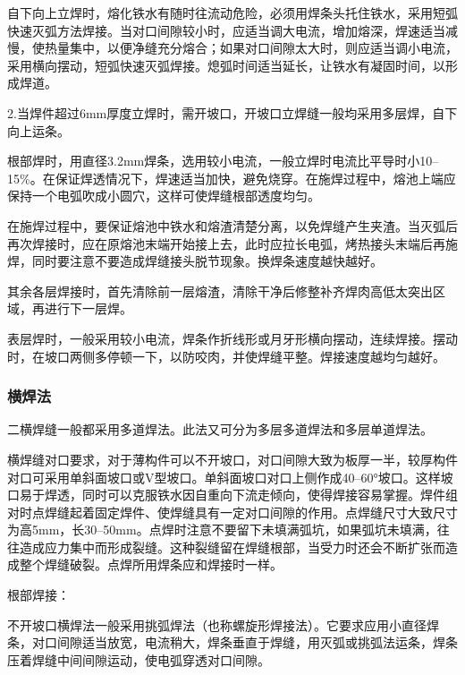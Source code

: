 \documentclass{ctexbook}
\begin{document}
自下向上立焊时，熔化铁水有随时往流动危险，必须用焊条头托住铁水，采用短弧快速灭弧方法焊接。当对口间隙较小时，应适当调大电流，增加熔深，焊速适当减慢，使热量集中，以便净缝充分熔合；如果对口间隙太大时，则应适当调小电流，采用横向摆动，短弧快速灭弧焊接。熄弧时间适当延长，让铁水有凝固时间，以形成焊道。

2.当焊件超过6mm厚度立焊时，需开坡口，开坡口立焊缝一般均采用多层焊，自下向上运条。

根部焊时，用直径3.2mm焊条，选用较小电流，一般立焊时电流比平导时小10--15\%。在保证焊透情况下，焊速适当加快，避免烧穿。在施焊过程中，熔池上端应保持一个电弧吹成小圆穴，这样可使焊缝根部透度均匀。

在施焊过程中，要保证熔池中铁水和熔渣清楚分离，以免焊缝产生夹渣。当灭弧后再次焊接时，应在原熔池末端开始接上去，此时应拉长电弧，烤热接头末端后再施焊，同时要注意不要造成焊缝接头脱节现象。换焊条速度越快越好。

其余各层焊接时，首先清除前一层熔渣，清除干净后修整补齐焊肉高低太突出区域，再进行下一层焊。

表层焊时，一般采用较小电流，焊条作折线形或月牙形横向摆动，连续焊接。摆动时，在坡口两侧多停顿一下，以防咬肉，并使焊缝平整。焊接速度越均匀越好。
\subsubsection{横焊法}
二横焊缝一般都采用多道焊法。此法又可分为多层多道焊法和多层单道焊法。

横焊缝对口要求，对于薄构件可以不开坡口，对口间隙大致为板厚一半，较厚构件对口可采用单斜面坡口或V型坡口。单斜面坡口对口上侧作成40--60°坡口。这样坡口易于焊透，同时可以克服铁水因自重向下流走倾向，使得焊接容易掌握。焊件组对时点焊缝起着固定焊件、使焊缝具有一定对口间隙的作用。点焊缝尺寸大致尺寸为高5mm，长30--50mm。点焊时注意不要留下未填满弧坑，如果弧坑未填满，往往造成应力集中而形成裂缝。这种裂缝留在焊缝根部，当受力时还会不断扩张而造成整个焊缝破裂。点焊所用焊条应和焊接时一样。

根部焊接：

不开坡口横焊法一般采用挑弧焊法（也称螺旋形焊接法）。它要求应用小直径焊条，对口间隙适当放宽，电流稍大，焊条垂直于焊缝，用灭弧或挑弧法运条，焊条压着焊缝中间间隙运动，使电弧穿透对口间隙。
\end{document}
